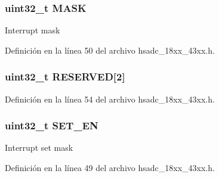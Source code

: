 \subsubsection[{\texorpdfstring{M\+A\+SK}{MASK}}]{ uint32\+\_\+t M\+A\+SK}\hypertarget{struct_h_s_a_d_c_i_n_t_c_t_r_l___t_ab832a1f3a60a10493eb8b93a9f7a049b}{}\label{struct_h_s_a_d_c_i_n_t_c_t_r_l___t_ab832a1f3a60a10493eb8b93a9f7a049b}
Interrupt mask 

Definición en la línea 50 del archivo hsadc\+\_\+18xx\+\_\+43xx.\+h.

\subsubsection[{\texorpdfstring{R\+E\+S\+E\+R\+V\+ED}{RESERVED}}]{\setlength{\rightskip}{0pt plus 5cm}uint32\+\_\+t R\+E\+S\+E\+R\+V\+ED\mbox{[}2\mbox{]}}\hypertarget{struct_h_s_a_d_c_i_n_t_c_t_r_l___t_afaf27b66c1edc60064db3fa6e693fb59}{}\label{struct_h_s_a_d_c_i_n_t_c_t_r_l___t_afaf27b66c1edc60064db3fa6e693fb59}


Definición en la línea 54 del archivo hsadc\+\_\+18xx\+\_\+43xx.\+h.

\subsubsection[{\texorpdfstring{S\+E\+T\+\_\+\+EN}{SET_EN}}]{ uint32\+\_\+t S\+E\+T\+\_\+\+EN}\hypertarget{struct_h_s_a_d_c_i_n_t_c_t_r_l___t_ad4ee2600dffc97b5487b479978433ed0}{}\label{struct_h_s_a_d_c_i_n_t_c_t_r_l___t_ad4ee2600dffc97b5487b479978433ed0}
Interrupt set mask 

Definición en la línea 49 del archivo hsadc\+\_\+18xx\+\_\+43xx.\+h.

